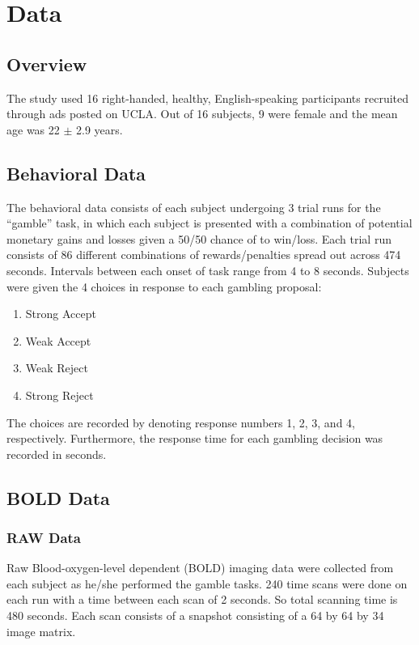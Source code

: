 \documentclass[11pt]{article}
\begin{document}
\section{Data}
\subsection{Overview}
The study used 16 right-handed, healthy, English-speaking participants 
recruited through ads posted on UCLA. Out of 16 subjects, 9 were female and 
the mean age was 22 $ \pm $ 2.9 years.\cite{Tom2007LossAversion} 

\subsection{Behavioral Data}
The behavioral data consists of each subject undergoing 3 trial runs for the 
``gamble'' task, in which each subject is presented with a combination of 
potential monetary gains and losses given a 50/50 chance of to win/loss. Each 
trial run consists of 86 different combinations of rewards/penalties spread 
out across 474 seconds. Intervals between each onset of task range from 4 to 
8 seconds. Subjects were given the 4 choices in response to each gambling 
proposal:
\begin{enumerate}
  \item Strong Accept
  \item Weak Accept
  \item Weak Reject
  \item Strong Reject
\end{enumerate}
The choices are recorded by denoting response numbers 1, 2, 3, and 4, 
respectively. Furthermore, the response time for each gambling decision was 
recorded in seconds. 
\subsection{BOLD Data}
\subsubsection{RAW Data}
Raw Blood-oxygen-level dependent (BOLD) imaging data were collected from each
subject as he/she performed the gamble tasks. 240 time scans were done on each
run with a time between each scan of 2 seconds. So total scanning time is 480
seconds. Each scan consists of a snapshot consisting of a 64 by 64 by 34 image
matrix.
\end{document}
